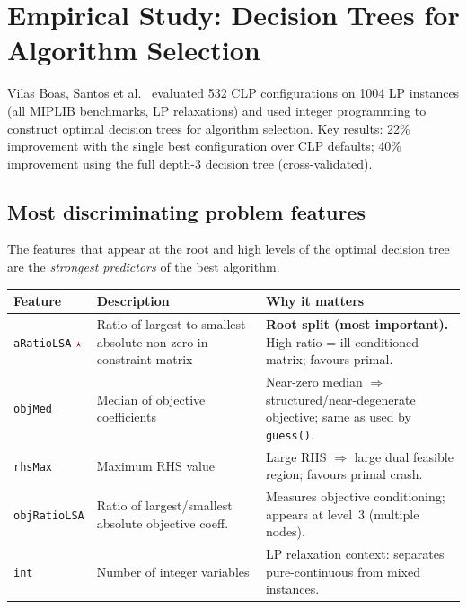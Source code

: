 \documentclass[11pt,a4paper]{article}
\newcommand{\important}{\textcolor{darkred}{\textbf{$\star$}}}
\begin{document}
\section{Empirical Study: Decision Trees for Algorithm Selection}
\label{sec:paper}

Vilas Boas, Santos et al.~\cite{VBoas2019} evaluated 532 CLP configurations on
1004 LP instances (all MIPLIB benchmarks, LP relaxations) and used integer
programming to construct optimal decision trees for algorithm selection.
Key results: 22\% improvement with the single best configuration over CLP defaults;
40\% improvement using the full depth-3 decision tree (cross-validated).

\subsection{Most discriminating problem features}

The features that appear at the root and high levels of the optimal decision tree
are the \emph{strongest predictors} of the best algorithm.

\begin{center}
\begin{tabular}{@{}P{3cm}P{5.5cm}P{5cm}@{}}
  \toprule
  \textbf{Feature} & \textbf{Description} & \textbf{Why it matters} \\
  \midrule
  \texttt{aRatioLSA} \important & Ratio of largest to smallest absolute
    non-zero in constraint matrix &
    \textbf{Root split (most important).} High ratio = ill-conditioned matrix;
    favours primal. \\
  \addlinespace
  \texttt{objMed} & Median of objective coefficients &
    Near-zero median $\Rightarrow$ structured/near-degenerate objective;
    same as used by \texttt{guess()}. \\
  \addlinespace
  \texttt{rhsMax} & Maximum RHS value &
    Large RHS $\Rightarrow$ large dual feasible region; favours primal crash. \\
  \addlinespace
  \texttt{objRatioLSA} & Ratio of largest/smallest absolute objective coeff. &
    Measures objective conditioning; appears at level~3 (multiple nodes). \\
  \addlinespace
  \texttt{int} & Number of integer variables &
    LP relaxation context: separates pure-continuous from mixed instances. \\
  \bottomrule
\end{tabular}
\end{center}
\end{document}
